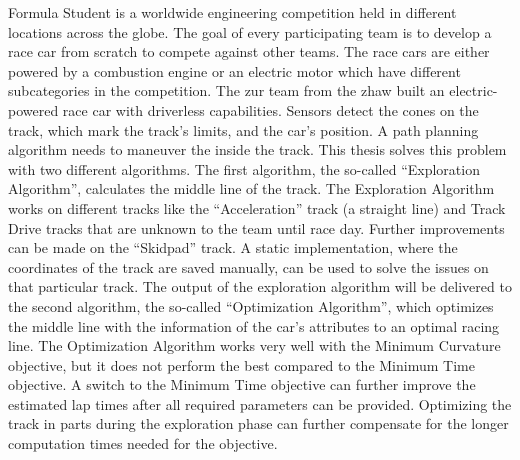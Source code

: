 Formula Student is a worldwide engineering competition held in different locations across the globe. The goal of every participating team is to develop a race car from scratch to compete against other teams. The race cars are either powered by a combustion engine or an electric motor which have different subcategories in the competition. The \acrlong{zur} team from the \acrlong{zhaw} built an electric-powered race car with driverless capabilities. Sensors detect the cones on the track, which mark the track's limits, and the car's position. A path planning algorithm needs to maneuver the inside the track. This thesis solves this problem with two different algorithms. The first algorithm, the so-called ``Exploration Algorithm'', calculates the middle line of the track. The Exploration Algorithm works on different tracks like the ``Acceleration'' track (a straight line) and Track Drive tracks that are unknown to the team until race day. Further improvements can be made on the ``Skidpad'' track. A static implementation, where the coordinates of the track are saved manually, can be used to solve the issues on that particular track. The output of the exploration algorithm will be delivered to the second algorithm, the so-called ``Optimization Algorithm'', which optimizes the middle line with the information of the car's attributes to an optimal racing line. The Optimization Algorithm works very well with the Minimum Curvature objective, but it does not perform the best compared to the Minimum Time objective. A switch to the Minimum Time objective can further improve the estimated lap times after all required parameters can be provided. Optimizing the track in parts during the exploration phase can further compensate for the longer computation times needed for the objective.